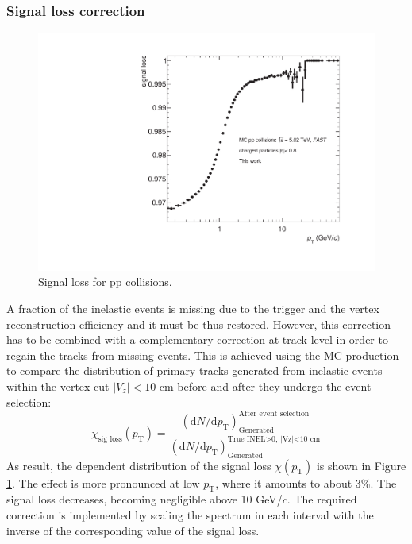\documentclass[12pt,a4paper]{report}
\begin{document}
\subsubsection{Signal loss correction}
\begin{figure}[tb!]
\centering
\includegraphics[width=12cm]{Plots/signalLossFAST.pdf}  
\caption{Signal loss for pp collisions.}
\label{sigLoss}
\end{figure}
A fraction of the inelastic events is missing due to the trigger and the vertex reconstruction efficiency and it must be thus restored. However, this correction has to be combined with a complementary correction at track-level in order to regain the tracks from missing events. This is achieved using the MC production to compare the distribution of primary tracks generated from inelastic events within the vertex cut $|V_z| < 10$ cm before and after they undergo the event selection:
\begin{equation}
\chi_\text{sig loss}(p_\text{T}) = \dfrac{(\text{d}N/\text{d}p_\text{T})_\text{Generated}^\text{After event selection}}{(\text{d}N/\text{d}p_\text{T})_\text{Generated}^\text{True INEL>0, |Vz|<10 cm}}
\end{equation}
As result, the \pt dependent distribution of the signal loss $\chi(p_\text{T})$ is shown in Figure \ref{sigLoss}. The effect is more pronounced at low $p_\text{T}$, where it amounts to about 3\%. The signal loss decreases, becoming negligible above 10 GeV/$c$. The required correction is implemented by scaling the \pt spectrum in each \pt interval with the inverse of the corresponding value of the signal loss.
\end{document}
